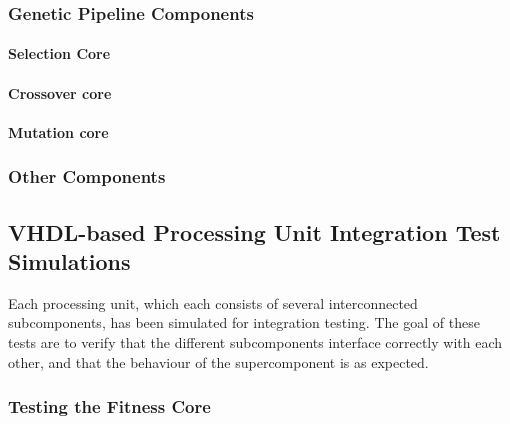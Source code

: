 



\subsubsection{Genetic Pipeline Components}
\paragraph{Selection Core}


\paragraph{Crossover core}





\paragraph{Mutation core}



\subsubsection{Other Components}

\subsection{\gls{VHDL}-based Processing Unit Integration Test Simulations}

Each processing unit, which each consists of several interconnected subcomponents, has been simulated for integration testing.
The goal of these tests are to verify that the different subcomponents interface correctly with each other, and that the behaviour of the supercomponent is as expected.

\subsubsection{Testing the Fitness Core}

